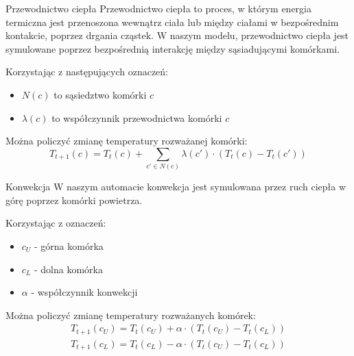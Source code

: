 \documentclass{beamer}
\begin{document}
\begin{frame}{Przewodnictwo ciepła}
    Przewodnictwo ciepła to proces, w którym energia termiczna jest przenoszona wewnątrz ciała lub między ciałami w bezpośrednim kontakcie, poprzez drgania cząstek. W naszym modelu, przewodnictwo ciepła jest symulowane poprzez bezpośrednią interakcję między sąsiadującymi komórkami.
    \newline

    Korzystając z następujących oznaczeń:
    \begin{itemize}
        \item \(N(c)\) to sąsiedztwo komórki \(c\)
        \item \(\lambda(c)\) to współczynnik przewodnictwa komórki \(c\)
    \end{itemize}
    Można policzyć zmianę temperatury rozważanej komórki:
    \begin{equation}
        T_{t+1}(c) = T_t(c) + \sum_{c' \in N(c)} \lambda(c') \cdot \left(T_t(c) - T_t(c')\right)
    \end{equation}
\end{frame}

\begin{frame}{Konwekcja}
    W naszym automacie konwekcja jest symulowana przez ruch ciepła w górę poprzez komórki powietrza.
    \newline

    Korzystając z oznaczeń:
    \begin{itemize}
        \item \(c_U\) - górna komórka
        \item \(c_L\) - dolna komórka
        \item \(\alpha\) - współczynnik konwekcji
    \end{itemize}
    Można policzyć zmianę temperatury rozważanych komórek:
    \begin{equation}
        \begin{array}{l}
            T_{t+1}(c_U) = T_t(c_U) + \alpha \cdot \left( T_t(c_U) - T_t(c_L) \right) \\
            T_{t+1}(c_L) = T_t(c_L) - \alpha \cdot \left( T_t(c_U) - T_t(c_L) \right)
        \end{array}
    \end{equation}
\end{frame}
\end{document}
